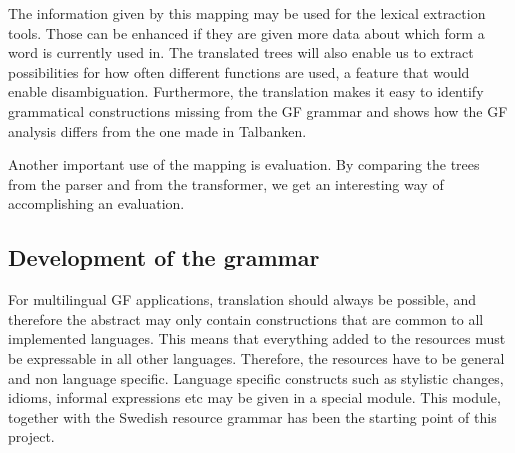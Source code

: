\documentclass[submission]{eptcs} %
\begin{document}
The information given by this mapping may be used for the lexical extraction
tools. Those can be enhanced if they are given more data about which form a word is
currently used in. 
The translated trees will also enable us to extract possibilities for how often
different functions are used, a feature that would enable disambiguation.
Furthermore, the translation makes it easy to identify grammatical constructions
missing from the GF grammar and shows how the GF analysis differs from the one made
in Talbanken.

Another important use of the mapping is evaluation. By comparing the trees
from the parser and from the transformer, we get an interesting way of
accomplishing an evaluation.


\subsection{Development of the grammar}

For multilingual GF applications, translation should always be possible, and
therefore the abstract may only contain constructions that
are common to all implemented languages.
This means that everything added to the resources
must be expressable in all other languages.
Therefore, the resources have to be general and non language specific.
Language specific constructs such as stylistic changes, idioms, informal
expressions etc may be given in a special module.
This module, together with the Swedish resource grammar has been the starting
point of this project.
\end{document}

